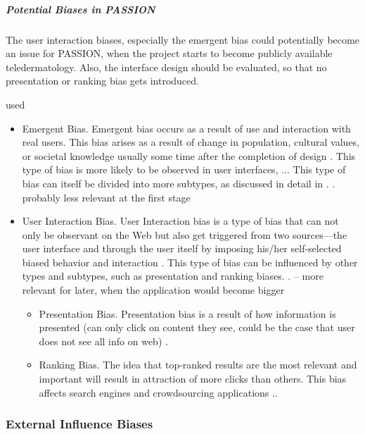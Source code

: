 \documentclass[12pt, a4paper, oneside]{book}   	%
\renewcommand{\paragraph}[1]{%
	\subsubsection*{#1}%
}
\newif\ifrawcitationactive
\newcommand{\rawcitationstart}{
	\color{purple}\rawcitationactivetrue
}
\newcommand{\rawcitationend}{
	\color{black}\rawcitationactivefalse
}
\newcommand{\rawcitationusedstart}{\color{violet}}
\newcommand{\rawcitationusedend}{%
	\ifrawcitationactive
	\color{purple}  %
	\else
	\color{black}  %
	\fi
}
\begin{document}
			
			\subparagraph{Potential Biases in PASSION}
			The user interaction biases, especially the emergent bias could potentially become an issue for PASSION, when the project starts to become publicly available \gls{teledermatology}. Also, the interface design should be evaluated, so that no presentation or ranking bias gets introduced.
			
			\rawcitationstart
			used
			\begin{itemize}		
			\rawcitationusedstart
			\item Emergent Bias. Emergent bias occurs as a result of use and interaction with real users. This bias arises as a result of change in population, cultural values, or societal knowledge usually some time after the completion of design \autocite{M53_Friedman_1996}. This type of bias is more likely to be observed in user interfaces, ... This type of bias can itself be divided into more subtypes, as discussed in detail in \autocite{M53_Friedman_1996}. \autocite{Mehrabi_2021}. probably less relevant at the first stage
			
			\item User Interaction Bias. User Interaction bias is a type of bias that can not only be observant on the Web but also get triggered from two sources—the user interface and through the user itself by imposing his/her self-selected biased behavior and interaction \autocite{M9_Baeza-Yates_2018}. This type of bias can be influenced by other types and subtypes, such as presentation and ranking biases. \autocite{Mehrabi_2021}. -- more relevant for later, when the application would become bigger
			\rawcitationusedend
			\begin{itemize}
				\item Presentation Bias. Presentation bias is a result of how information is presented \autocite{M9_Baeza-Yates_2018} (can only click on content they see, could be the case that user does not see all info on web) \autocite{Mehrabi_2021}.
				\item Ranking Bias. The idea that top-ranked results are the most relevant and important will result in attraction of more clicks than others. This bias affects search engines \autocite{M9_Baeza-Yates_2018} and crowdsourcing applications \autocite{M93_Lerman_2014}.\autocite{Mehrabi_2021}.
			\end{itemize}
			\end{itemize}
			\rawcitationend
						
			\paragraph{External Influence Biases}
			
\end{document}
